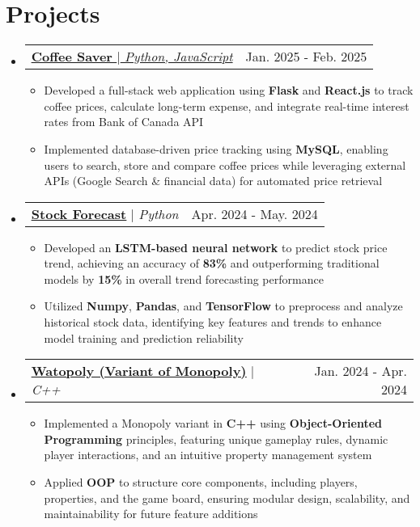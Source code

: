 \documentclass[letterpaper,11pt]{article}
\makeatletter
\newcommand{\resumeItem}[1]{
  \item\small{
    {#1 \vspace{-2pt}}
  }
}
\newcommand{\resumeProjectHeading}[2]{
    \item
    \begin{tabular*}{0.97\textwidth}{l@{\extracolsep{\fill}}r}
      \small#1 & #2 \\
    \end{tabular*}\vspace{-7pt}
}
\newcommand{\resumeSubHeadingListStart}{\begin{itemize}[leftmargin=0.15in, label={}]}
\newcommand{\resumeSubHeadingListEnd}{\end{itemize}}
\newcommand{\resumeItemListStart}{\begin{itemize}}
\newcommand{\resumeItemListEnd}{\end{itemize}\vspace{-5pt}}
\makeatother
\begin{document}
\section{Projects}
  \resumeSubHeadingListStart
    \resumeProjectHeading
      {\href{https://github.com/ThomasLiuuu/Projects/tree/main/Save\%20Money}{\underline{\textbf{Coffee Saver}} $|$ \emph{Python, JavaScript}}}{Jan. 2025 - Feb. 2025}
      \resumeItemListStart
        \resumeItem{Developed a full-stack web application using \textbf{Flask} and \textbf{React.js} to track coffee prices, calculate long-term expense, and integrate real-time interest rates from Bank of Canada API}
        \resumeItem{Implemented database-driven price tracking using \textbf{MySQL}, enabling users to search, store and compare coffee prices while leveraging external APIs (Google Search \& financial data) for automated price retrieval}
      \resumeItemListEnd

    \resumeProjectHeading
      {\href{https://github.com/ThomasLiuuu/Projects/tree/main/Stock-Forecast}{\underline{\textbf{Stock Forecast}}} $|$ \emph{Python}}{Apr. 2024 - May. 2024}
      \resumeItemListStart
        \resumeItem{Developed an \textbf{LSTM-based neural network} to predict stock price trend, achieving an accuracy of \textbf{83\%} and outperforming traditional models by \textbf{15\%} in overall trend forecasting performance}
        \resumeItem{Utilized \textbf{Numpy}, \textbf{Pandas}, and \textbf{TensorFlow} to preprocess and analyze historical stock data, identifying key features and trends to enhance model training and prediction reliability}
      \resumeItemListEnd

    \resumeProjectHeading
      {\href{https://github.com/ThomasLiuuu/Projects/tree/main/Watopoly}{\underline{\textbf{Watopoly (Variant of Monopoly)}}} $|$ \emph{C++}}{Jan. 2024 - Apr. 2024}
      \resumeItemListStart
        \resumeItem{Implemented a Monopoly variant in \textbf{C++} using \textbf{Object-Oriented Programming} principles, featuring unique gameplay rules, dynamic player interactions, and an intuitive property management system}
        \resumeItem{Applied \textbf{OOP} to structure core components, including players, properties, and the game board, ensuring modular design, scalability, and maintainability for future feature additions}
      \resumeItemListEnd

  \resumeSubHeadingListEnd
\end{document}
